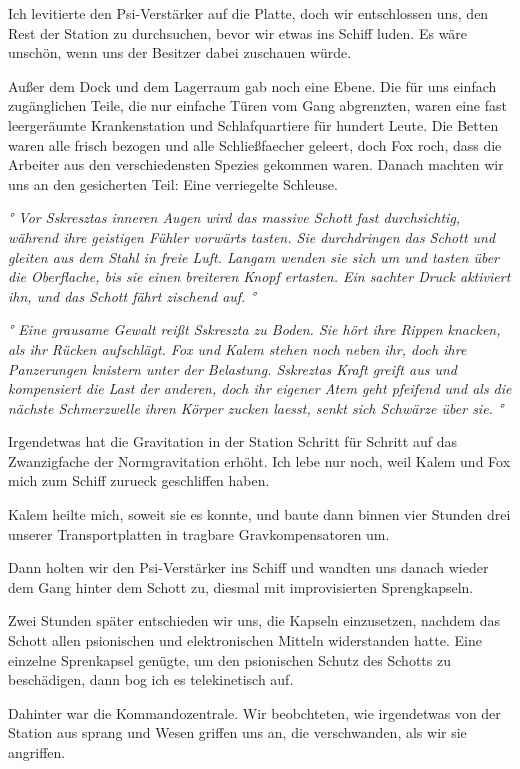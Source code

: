 \documentclass[11pt]{article}
\begin{document}
Ich levitierte den Psi-Verstärker auf die Platte, doch wir entschlossen
uns, den Rest der Station zu durchsuchen, bevor wir etwas ins Schiff
luden. Es wäre unschön, wenn uns der Besitzer dabei zuschauen würde.

Außer dem Dock und dem Lagerraum gab noch eine Ebene. Die für uns
einfach zugänglichen Teile, die nur einfache Türen vom Gang abgrenzten,
waren eine fast leergeräumte Krankenstation und Schlafquartiere für
hundert Leute. Die Betten waren alle frisch bezogen und alle
Schließfaecher geleert, doch Fox roch, dass die Arbeiter aus den
verschiedensten Spezies gekommen waren. Danach machten wir uns an den
gesicherten Teil: Eine verriegelte Schleuse.

\emph{° Vor Sskresztas inneren Augen wird das massive Schott fast
durchsichtig, während ihre geistigen Fühler vorwärts tasten. Sie
durchdringen das Schott und gleiten aus dem Stahl in freie Luft. Langam
wenden sie sich um und tasten über die Oberflache, bis sie einen
breiteren Knopf ertasten. Ein sachter Druck aktiviert ihn, und das
Schott fährt zischend auf. °}

\emph{° Eine grausame Gewalt reißt Sskreszta zu Boden. Sie hört ihre
Rippen knacken, als ihr Rücken aufschlägt. Fox und Kalem stehen noch
neben ihr, doch ihre Panzerungen knistern unter der Belastung. Sskreztas
Kraft greift aus und kompensiert die Last der anderen, doch ihr eigener
Atem geht pfeifend und als die nächste Schmerzwelle ihren Körper zucken
laesst, senkt sich Schwärze über sie. °}

Irgendetwas hat die Gravitation in der Station Schritt für Schritt auf
das Zwanzigfache der Normgravitation erhöht. Ich lebe nur noch, weil
Kalem und Fox mich zum Schiff zurueck geschliffen haben.

Kalem heilte mich, soweit sie es konnte, und baute dann binnen vier
Stunden drei unserer Transportplatten in tragbare Gravkompensatoren um.

Dann holten wir den Psi-Verstärker ins Schiff und wandten uns danach
wieder dem Gang hinter dem Schott zu, diesmal mit improvisierten
Sprengkapseln.

Zwei Stunden später entschieden wir uns, die Kapseln einzusetzen,
nachdem das Schott allen psionischen und elektronischen Mitteln
widerstanden hatte. Eine einzelne Sprenkapsel genügte, um den
psionischen Schutz des Schotts zu beschädigen, dann bog ich es
telekinetisch auf.

Dahinter war die Kommandozentrale. Wir beobchteten, wie irgendetwas von
der Station aus sprang und Wesen griffen uns an, die verschwanden, als
wir sie angriffen.
\end{document}
